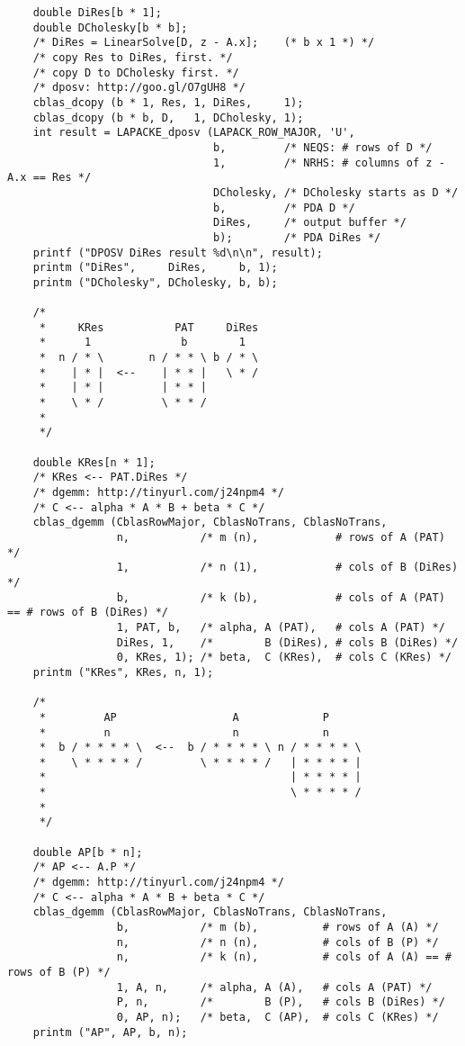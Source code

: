 \documentclass[10pt,oneside,x11names]{article}
\begin{document}
\begin{verbatim}
    double DiRes[b * 1];
    double DCholesky[b * b];
    /* DiRes = LinearSolve[D, z - A.x];    (* b x 1 *) */
    /* copy Res to DiRes, first. */
    /* copy D to DCholesky first. */
    /* dposv: http://goo.gl/O7gUH8 */
    cblas_dcopy (b * 1, Res, 1, DiRes,     1);
    cblas_dcopy (b * b, D,   1, DCholesky, 1);
    int result = LAPACKE_dposv (LAPACK_ROW_MAJOR, 'U',
                                b,         /* NEQS: # rows of D */
                                1,         /* NRHS: # columns of z - A.x == Res */
                                DCholesky, /* DCholesky starts as D */
                                b,         /* PDA D */
                                DiRes,     /* output buffer */
                                b);        /* PDA DiRes */
    printf ("DPOSV DiRes result %d\n\n", result);
    printm ("DiRes",     DiRes,     b, 1);
    printm ("DCholesky", DCholesky, b, b);

    /*
     *     KRes           PAT     DiRes
     *      1              b        1
     *  n / * \       n / * * \ b / * \
     *    | * |  <--    | * * |   \ * /
     *    | * |         | * * |
     *    \ * /         \ * * /
     *
     */

    double KRes[n * 1];
    /* KRes <-- PAT.DiRes */
    /* dgemm: http://tinyurl.com/j24npm4 */
    /* C <-- alpha * A * B + beta * C */
    cblas_dgemm (CblasRowMajor, CblasNoTrans, CblasNoTrans,
                 n,           /* m (n),            # rows of A (PAT) */
                 1,           /* n (1),            # cols of B (DiRes) */
                 b,           /* k (b),            # cols of A (PAT) == # rows of B (DiRes) */
                 1, PAT, b,   /* alpha, A (PAT),   # cols A (PAT) */
                 DiRes, 1,    /*        B (DiRes), # cols B (DiRes) */
                 0, KRes, 1); /* beta,  C (KRes),  # cols C (KRes) */
    printm ("KRes", KRes, n, 1);

    /*
     *         AP                  A             P
     *         n                   n             n
     *  b / * * * * \  <--  b / * * * * \ n / * * * * \
     *    \ * * * * /         \ * * * * /   | * * * * |
     *                                      | * * * * |
     *                                      \ * * * * /
     *
     */

    double AP[b * n];
    /* AP <-- A.P */
    /* dgemm: http://tinyurl.com/j24npm4 */
    /* C <-- alpha * A * B + beta * C */
    cblas_dgemm (CblasRowMajor, CblasNoTrans, CblasNoTrans,
                 b,           /* m (b),          # rows of A (A) */
                 n,           /* n (n),          # cols of B (P) */
                 n,           /* k (n),          # cols of A (A) == # rows of B (P) */
                 1, A, n,     /* alpha, A (A),   # cols A (PAT) */
                 P, n,        /*        B (P),   # cols B (DiRes) */
                 0, AP, n);   /* beta,  C (AP),  # cols C (KRes) */
    printm ("AP", AP, b, n);


\end{verbatim}
\end{document}
